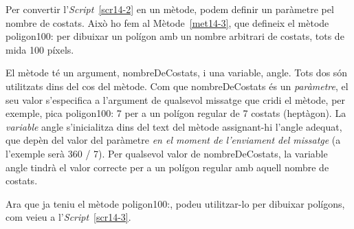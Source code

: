 Per convertir  l'\emph{Script}~\ref{scr14-2} en un mètode, podem definir un paràmetre pel nombre de costats. Això ho fem al Mètode~\ref{met14-3}, que defineix el mètode \textsf{poligon100:} per dibuixar un polígon amb un nombre arbitrari de costats, tots de mida 100 píxels.
El mètode té un argument, \textsf{nombreDeCostats}, i una variable, \textsf{angle}. Tots dos són utilitzats dins del cos del mètode. Com que \textsf{nombreDeCostats} és un \emph{paràmetre}, el seu valor s'especifica a l'argument de qualsevol missatge que cridi el mètode, per exemple, \textsf{pica poligon100: 7} per a un polígon regular de 7 costats (heptàgon). La \emph{variable} \textsf{angle} s'inicialitza dins del text del mètode assignant-hi l'angle adequat, que depèn del valor del paràmetre \emph{en el moment de l'enviament del missatge} (a l'exemple serà \textsf{360 / 7}). Per qualsevol valor de \textsf{nombreDeCostats}, la variable \textsf{angle} tindrà el valor correcte per a un polígon regular amb aquell nombre de costats. 

Ara que ja teniu el mètode \textsf{poligon100:}, podeu utilitzar-lo per dibuixar polígons, com veieu a l'\emph{Script}~\ref{scr14-3}.  

\newpage

